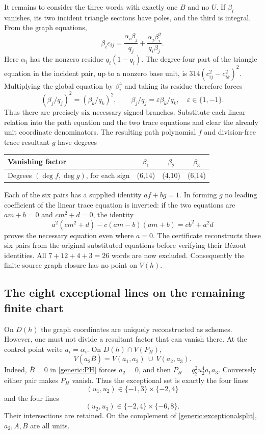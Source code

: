 \documentclass[11pt,a4paper]{article}
\theoremstyle{remark}\newtheorem{remark}[theorem]{Remark}
\newcommand{\Ab}{\overline A}\newcommand{\Bb}{\overline B}
\begin{document}
It remains to consider the three words with exactly one $B$ and no $U$.
If $\beta_i$ vanishes, its two incident triangle sections have poles,
and the third is integral. From the graph equations,
\[
 \beta_i c_{ij}=\frac{\alpha_i\beta_j}{q_j}
 +\frac{\alpha_j\beta_i^2}{q_i\beta_j}.
\]
Here $\alpha_i$ has the nonzero residue $q_i(1-q_i)$. The degree-four
part of the triangle equation in the incident pair, up to a nonzero base
unit, is $314(c_{ij}^2-c_{ik}^2)^2$. Multiplying the global equation by
$\beta_i^4$ and taking its residue therefore forces
\[
 (\beta_j/q_j)^2=(\beta_k/q_k)^2,
 \qquad\beta_j/q_j=\varepsilon\beta_k/q_k,
 \quad\varepsilon\in\{1,-1\}.
\]
Thus there are precisely six necessary signed branches. Substitute each
linear relation into the path equation and the two trace equations and
clear the already unit coordinate denominators. The resulting path
polynomial $f$ and division-free trace resultant $g$ have degrees
\begin{center}\small
\begin{tabular}{@{}lccc@{}}\toprule
Vanishing factor & $\beta_1$ & $\beta_2$ & $\beta_3$\\\midrule
Degrees $(\deg f,\deg g)$, for each sign &(6,14)&(4,10)&(6,14)\\
\bottomrule\end{tabular}
\end{center}
Each of the six pairs has a supplied identity $af+bg=1$. In forming $g$
no leading coefficient of the linear trace equation is inverted: if the
two equations are $am+b=0$ and $cm^2+d=0$, the identity
\begin{equation}\label{generic:traceelimination}
 a^2(cm^2+d)-c(am-b)(am+b)=cb^2+a^2d
\end{equation}
proves the necessary equation even where $a=0$. The certificate reconstructs
these six pairs from the original substituted equations before verifying
their B\'ezout identities. All $7+12+4+3=26$ words are now excluded.
Consequently the finite-source graph closure has no point on $V(h)$.

\subsection{The eight exceptional lines on the remaining finite chart}
\label{generic:exceptionallines}
On $D(h)$ the graph coordinates are uniquely reconstructed as schemes.
However, one must not divide a resultant factor that can vanish there.
At the control point write $a_i=\alpha_i$. On $D(h)\cap V(P_H)$,
\begin{equation}\label{generic:exceptionalsplit}
 V(a_2\Bb)=V(a_1,a_2)\ \cup\ V(a_2,a_3).
\end{equation}
Indeed, $\Bb=0$ in \eqref{generic:PH} forces $a_2=0$, and then
$P_H=q_2^2u_2^4a_1a_3$. Conversely either pair makes $P_H$ vanish.
Thus the exceptional set is exactly the four lines
\[
 (u_1,u_2)\in\{-1,3\}\times\{-2,4\}
\]
and the four lines
\[
 (u_2,u_3)\in\{-2,4\}\times\{-6,8\}.
\]
Their intersections are retained. On the complement of
\eqref{generic:exceptionalsplit}, $a_2,\Ab,\Bb$ are all units.
\end{document}
